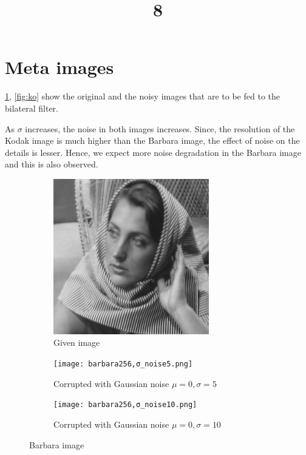 \documentclass[a4paper, landscape]{article}
\title{8}
\date{}
\begin{document}
\maketitle
\section{Meta images}
\ref{fig:bo}, \ref{fig:ko} show the original and the noisy images that are to be fed to  the bilateral filter.

As $\sigma$ increases, the noise in both images increases. 
Since, the resolution of the Kodak image is much higher than the Barbara image, the effect of noise on the details is lesser. Hence, we expect more noise degradation in the Barbara image and this is also observed.
\begin{figure}
    \centering
    \begin{subfigure}{0.33\linewidth}
        \centering
        \includegraphics[width=\linewidth]{barbara256.png}
        \caption{Given image}
    \end{subfigure}
    \begin{subfigure}{0.33\linewidth}
        \centering
        \texttt{[image: barbara256,σ\_noise5.png]}
        \caption{Corrupted with Gaussian noise $\mu=0, \sigma=5$}
    \end{subfigure}
    \begin{subfigure}{0.33\linewidth}
        \centering
        \texttt{[image: barbara256,σ\_noise10.png]}
        \caption{Corrupted with Gaussian noise $\mu=0, \sigma=10$}
    \end{subfigure}
    \caption{Barbara image}
    \label{fig:bo}
\end{figure}
\end{document}

